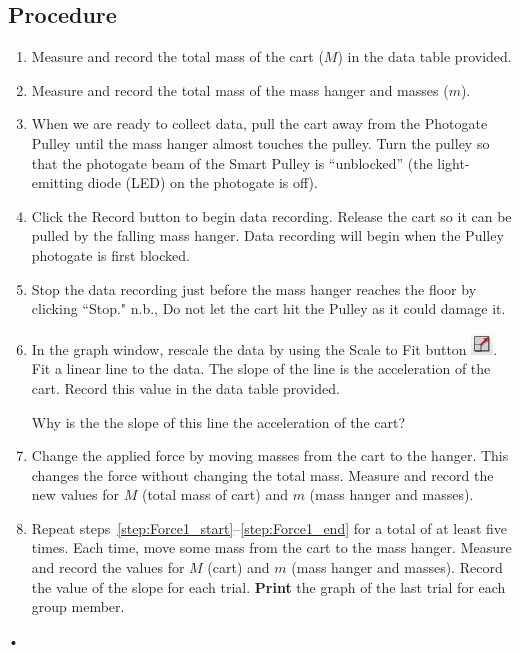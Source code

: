 \documentclass[main.tex]{subfiles}
\begin{document}
\subsection*{Procedure}
\begin{enumerate}
\item
Measure and record the total mass of the cart ($M$) in the data table provided.
\item
Measure and record the total mass of the mass hanger and masses ($m$).
\item \label{step:Force1_start}
When we are ready to collect data, pull the cart away from the Photogate Pulley until the mass hanger almost touches the pulley. Turn the pulley so that the photogate beam of the Smart Pulley is “unblocked” (the light-emitting diode (LED) on the photogate is off).
\item
Click the Record button to begin data recording. Release the cart so it can be pulled by the falling mass hanger. Data recording will begin when the Pulley photogate is first blocked. 
\item
Stop the data recording just before the mass hanger reaches the floor by clicking ``Stop."  n.b., Do not let the cart hit the Pulley as it could damage it.
\item \label{step:Force1_end}
In the graph window, rescale the data by using the Scale to Fit button \includegraphics{Rescale}. Fit a linear line to the data. The slope of the line is the acceleration of the cart. Record this value in the data table provided.
\begin{question}
Why is the the slope of this line the acceleration of the cart?
\end{question}
\item
Change the applied force by moving masses from the cart to the hanger. This changes the force without changing the total mass. Measure and record the new values for $M$ (total mass of cart) and $m$ (mass hanger and masses).
\item
Repeat steps~\ref{step:Force1_start}--\ref{step:Force1_end} for a total of at least five times. Each time, move some mass from the cart to the mass hanger. Measure and record the values for $M$ (cart) and $m$ (mass hanger and masses). Record the value of the slope for each trial. \textbf{Print} the graph of the last trial for each group member.
\end{enumerate}•
\end{document}
